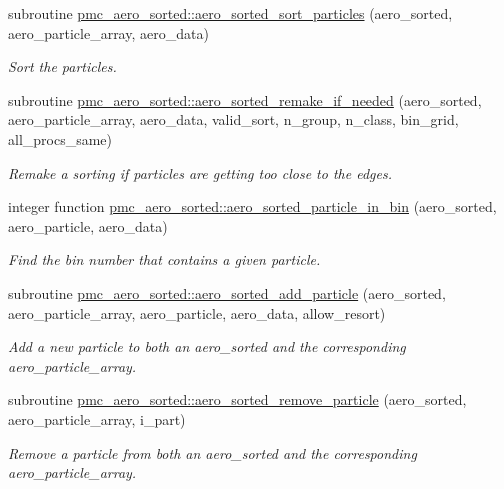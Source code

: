 \begin{DoxyCompactItemize}
subroutine \mbox{\hyperlink{namespacepmc__aero__sorted_a05ae0618baddc3764e98024c670cc248}{pmc\+\_\+aero\+\_\+sorted\+::aero\+\_\+sorted\+\_\+sort\+\_\+particles}} (aero\+\_\+sorted, aero\+\_\+particle\+\_\+array, aero\+\_\+data)
\begin{DoxyCompactList}\small\item\em Sort the particles. \end{DoxyCompactList}\item 
subroutine \mbox{\hyperlink{namespacepmc__aero__sorted_a7d7a0e73c0725fe40ed2ec64c16455db}{pmc\+\_\+aero\+\_\+sorted\+::aero\+\_\+sorted\+\_\+remake\+\_\+if\+\_\+needed}} (aero\+\_\+sorted, aero\+\_\+particle\+\_\+array, aero\+\_\+data, valid\+\_\+sort, n\+\_\+group, n\+\_\+class, bin\+\_\+grid, all\+\_\+procs\+\_\+same)
\begin{DoxyCompactList}\small\item\em Remake a sorting if particles are getting too close to the edges. \end{DoxyCompactList}\item 
integer function \mbox{\hyperlink{namespacepmc__aero__sorted_a00a9d9ddcf3ae8d7a793c6a3a6da08d7}{pmc\+\_\+aero\+\_\+sorted\+::aero\+\_\+sorted\+\_\+particle\+\_\+in\+\_\+bin}} (aero\+\_\+sorted, aero\+\_\+particle, aero\+\_\+data)
\begin{DoxyCompactList}\small\item\em Find the bin number that contains a given particle. \end{DoxyCompactList}\item 
subroutine \mbox{\hyperlink{namespacepmc__aero__sorted_ab76ef898301b54001fdfdfb0ae346bbe}{pmc\+\_\+aero\+\_\+sorted\+::aero\+\_\+sorted\+\_\+add\+\_\+particle}} (aero\+\_\+sorted, aero\+\_\+particle\+\_\+array, aero\+\_\+particle, aero\+\_\+data, allow\+\_\+resort)
\begin{DoxyCompactList}\small\item\em Add a new particle to both an aero\+\_\+sorted and the corresponding aero\+\_\+particle\+\_\+array. \end{DoxyCompactList}\item 
subroutine \mbox{\hyperlink{namespacepmc__aero__sorted_a3e4e18cdf33430088d88a85c00c55ed8}{pmc\+\_\+aero\+\_\+sorted\+::aero\+\_\+sorted\+\_\+remove\+\_\+particle}} (aero\+\_\+sorted, aero\+\_\+particle\+\_\+array, i\+\_\+part)
\begin{DoxyCompactList}\small\item\em Remove a particle from both an aero\+\_\+sorted and the corresponding aero\+\_\+particle\+\_\+array. \end{DoxyCompactList}\item 

\end{DoxyCompactItemize}
